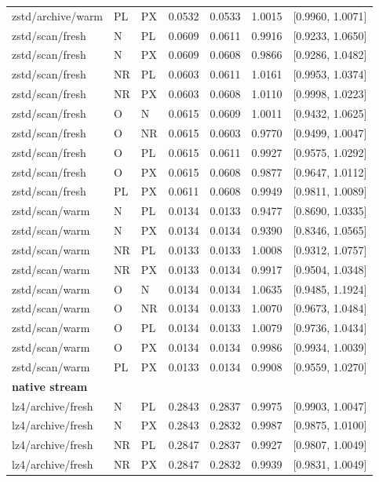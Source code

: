 \begin{longtable}{lllrrrr}
zstd/archive/warm & PL & PX & 0.0532 & 0.0533 & 1.0015 & [0.9960, 1.0071] \\
zstd/scan/fresh & N & PL & 0.0609 & 0.0611 & 0.9916 & [0.9233, 1.0650] \\
zstd/scan/fresh & N & PX & 0.0609 & 0.0608 & 0.9866 & [0.9286, 1.0482] \\
zstd/scan/fresh & NR & PL & 0.0603 & 0.0611 & 1.0161 & [0.9953, 1.0374] \\
zstd/scan/fresh & NR & PX & 0.0603 & 0.0608 & 1.0110 & [0.9998, 1.0223] \\
zstd/scan/fresh & O & N & 0.0615 & 0.0609 & 1.0011 & [0.9432, 1.0625] \\
zstd/scan/fresh & O & NR & 0.0615 & 0.0603 & 0.9770 & [0.9499, 1.0047] \\
zstd/scan/fresh & O & PL & 0.0615 & 0.0611 & 0.9927 & [0.9575, 1.0292] \\
zstd/scan/fresh & O & PX & 0.0615 & 0.0608 & 0.9877 & [0.9647, 1.0112] \\
zstd/scan/fresh & PL & PX & 0.0611 & 0.0608 & 0.9949 & [0.9811, 1.0089] \\
zstd/scan/warm & N & PL & 0.0134 & 0.0133 & 0.9477 & [0.8690, 1.0335] \\
zstd/scan/warm & N & PX & 0.0134 & 0.0134 & 0.9390 & [0.8346, 1.0565] \\
zstd/scan/warm & NR & PL & 0.0133 & 0.0133 & 1.0008 & [0.9312, 1.0757] \\
zstd/scan/warm & NR & PX & 0.0133 & 0.0134 & 0.9917 & [0.9504, 1.0348] \\
zstd/scan/warm & O & N & 0.0134 & 0.0134 & 1.0635 & [0.9485, 1.1924] \\
zstd/scan/warm & O & NR & 0.0134 & 0.0133 & 1.0070 & [0.9673, 1.0484] \\
zstd/scan/warm & O & PL & 0.0134 & 0.0133 & 1.0079 & [0.9736, 1.0434] \\
zstd/scan/warm & O & PX & 0.0134 & 0.0134 & 0.9986 & [0.9934, 1.0039] \\
zstd/scan/warm & PL & PX & 0.0133 & 0.0134 & 0.9908 & [0.9559, 1.0270] \\
\multicolumn{7}{l}{\textbf{native stream}} \\
lz4/archive/fresh & N & PL & 0.2843 & 0.2837 & 0.9975 & [0.9903, 1.0047] \\
lz4/archive/fresh & N & PX & 0.2843 & 0.2832 & 0.9987 & [0.9875, 1.0100] \\
lz4/archive/fresh & NR & PL & 0.2847 & 0.2837 & 0.9927 & [0.9807, 1.0049] \\
lz4/archive/fresh & NR & PX & 0.2847 & 0.2832 & 0.9939 & [0.9831, 1.0049] \\

\end{longtable}
